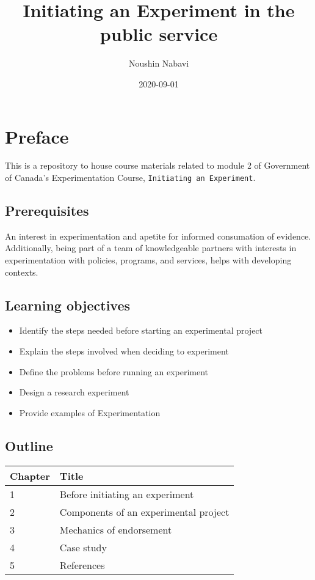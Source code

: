 \documentclass[]{book}
\title{Initiating an Experiment in the public service}
\author{Noushin Nabavi}
\date{2020-09-01}
\providecommand{\tightlist}{%
  \setlength{\itemsep}{0pt}\setlength{\parskip}{0pt}}
\begin{document}
\maketitle

{
\setcounter{tocdepth}{1}
\tableofcontents
}
\hypertarget{preface}{%
\chapter{Preface}\label{preface}}

This is a repository to house course materials related to module 2 of Government of Canada's Experimentation Course, \texttt{Initiating\ an\ Experiment}.

\hypertarget{prerequisites}{%
\section{Prerequisites}\label{prerequisites}}

An interest in experimentation and apetite for informed consumation of evidence. Additionally, being part of a team of knowledgeable partners with interests in experimentation with policies, programs, and services, helps with developing contexts.

\hypertarget{learning-objectives}{%
\section{Learning objectives}\label{learning-objectives}}

\begin{itemize}
\tightlist
\item
  Identify the steps needed before starting an experimental project
\item
  Explain the steps involved when deciding to experiment
\item
  Define the problems before running an experiment
\item
  Design a research experiment
\item
  Provide examples of Experimentation
\end{itemize}

\hypertarget{outline}{%
\section{Outline}\label{outline}}

\begin{longtable}[]{@{}ll@{}}
\toprule
Chapter & Title\tabularnewline
\midrule
\endhead
1 & Before initiating an experiment\tabularnewline
2 & Components of an experimental project\tabularnewline
3 & Mechanics of endorsement\tabularnewline
4 & Case study\tabularnewline
5 & References\tabularnewline
\bottomrule
\end{longtable}
\end{document}
